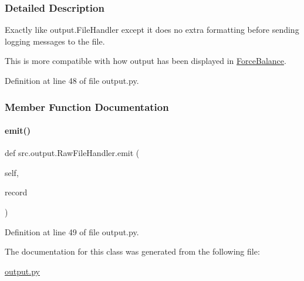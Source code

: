 \subsubsection{Detailed Description}
Exactly like output.\+File\+Handler except it does no extra formatting before sending logging messages to the file. 

This is more compatible with how output has been displayed in \hyperlink{namespaceForceBalance}{Force\+Balance}. 

Definition at line 48 of file output.\+py.



\subsubsection{Member Function Documentation}
\mbox{\label{classsrc_1_1output_1_1RawFileHandler_aba10676e642163e8e58f083512e65cf1}} 
\paragraph{\texorpdfstring{emit()}{emit()}}
{\footnotesize\ttfamily def src.\+output.\+Raw\+File\+Handler.\+emit (\begin{DoxyParamCaption}\item[{}]{self,  }\item[{}]{record }\end{DoxyParamCaption})}



Definition at line 49 of file output.\+py.



The documentation for this class was generated from the following file\+:\begin{DoxyCompactItemize}
\item 
\hyperlink{output_8py}{output.\+py}\end{DoxyCompactItemize}

